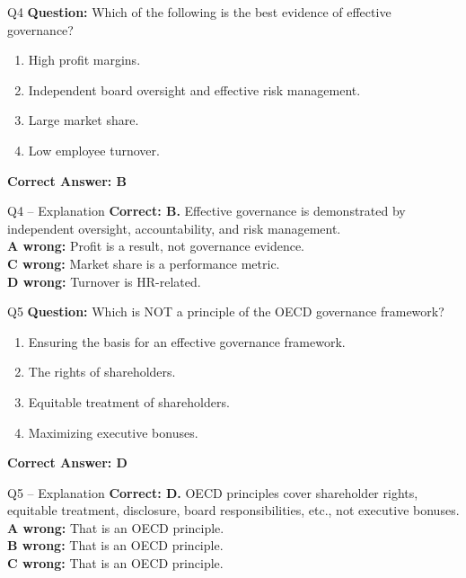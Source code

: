 \documentclass[aspectratio=169,10pt]{beamer}
\begin{document}
	\begin{frame}[t]{Q4}
		\small
		\textbf{Question:} Which of the following is the best evidence of effective governance?
		\begin{enumerate}[label=\Alph*.,itemsep=1pt,topsep=2pt]
			\item High profit margins.
			\item Independent board oversight and effective risk management.
			\item Large market share.
			\item Low employee turnover.
		\end{enumerate}
		\vspace{4pt}
		\textbf{Correct Answer: B}
	\end{frame}
	
	\begin{frame}[t]{Q4 -- Explanation}
		\small
		\textbf{Correct: B.} Effective governance is demonstrated by independent oversight, accountability, and risk management. \\[4pt]
		\textbf{A wrong:} Profit is a result, not governance evidence. \\[2pt]
		\textbf{C wrong:} Market share is a performance metric. \\[2pt]
		\textbf{D wrong:} Turnover is HR-related.
	\end{frame}
	
	\begin{frame}[t]{Q5}
		\small
		\textbf{Question:} Which is NOT a principle of the OECD governance framework?
		\begin{enumerate}[label=\Alph*.,itemsep=1pt,topsep=2pt]
			\item Ensuring the basis for an effective governance framework.
			\item The rights of shareholders.
			\item Equitable treatment of shareholders.
			\item Maximizing executive bonuses.
		\end{enumerate}
		\vspace{4pt}
		\textbf{Correct Answer: D}
	\end{frame}
	
	\begin{frame}[t]{Q5 -- Explanation}
		\small
		\textbf{Correct: D.} OECD principles cover shareholder rights, equitable treatment, disclosure, board responsibilities, etc., not executive bonuses. \\[4pt]
		\textbf{A wrong:} That is an OECD principle. \\[2pt]
		\textbf{B wrong:} That is an OECD principle. \\[2pt]
		\textbf{C wrong:} That is an OECD principle.
	\end{frame}
	
\end{document}
